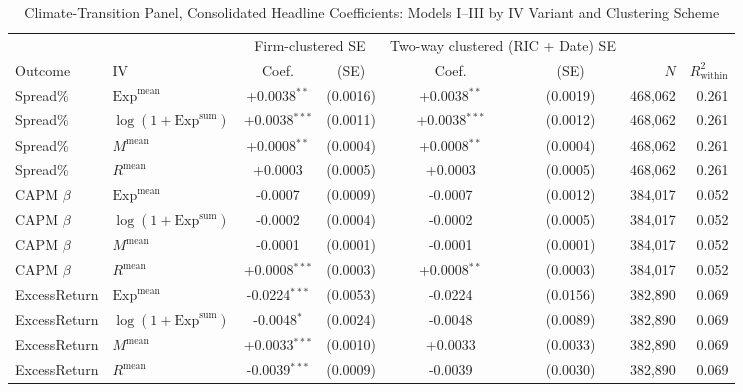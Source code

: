 \begin{table}[htbp]
\centering
\footnotesize
\caption{Climate-Transition Panel, Consolidated Headline Coefficients: Models I--III by IV Variant and Clustering Scheme}
\label{tab:v2_core}
\begin{threeparttable}
\begin{tabular}{l l c c c c r r}
\toprule
 & & \multicolumn{2}{c}{Firm-clustered SE} & \multicolumn{2}{c}{Two-way clustered (RIC + Date) SE} & & \\
\cmidrule(lr){3-4}\cmidrule(lr){5-6}
Outcome & IV & Coef. & (SE) & Coef. & (SE) & $N$ & $R^2_{\text{within}}$ \\
\midrule
Spread\% & $\mathrm{Exp}^{\text{mean}}$ & +0.0038$^{**}$ & (0.0016) & +0.0038$^{**}$ & (0.0019) & 468,062 & 0.261 \\
Spread\% & $\log(1+\mathrm{Exp}^{\text{sum}})$ & +0.0038$^{***}$ & (0.0011) & +0.0038$^{***}$ & (0.0012) & 468,062 & 0.261 \\
Spread\% & $M^{\text{mean}}$ & +0.0008$^{**}$ & (0.0004) & +0.0008$^{**}$ & (0.0004) & 468,062 & 0.261 \\
Spread\% & $R^{\text{mean}}$ & +0.0003 & (0.0005) & +0.0003 & (0.0005) & 468,062 & 0.261 \\
\addlinespace
CAPM $\beta$ & $\mathrm{Exp}^{\text{mean}}$ & -0.0007 & (0.0009) & -0.0007 & (0.0012) & 384,017 & 0.052 \\
CAPM $\beta$ & $\log(1+\mathrm{Exp}^{\text{sum}})$ & -0.0002 & (0.0004) & -0.0002 & (0.0005) & 384,017 & 0.052 \\
CAPM $\beta$ & $M^{\text{mean}}$ & -0.0001 & (0.0001) & -0.0001 & (0.0001) & 384,017 & 0.052 \\
CAPM $\beta$ & $R^{\text{mean}}$ & +0.0008$^{***}$ & (0.0003) & +0.0008$^{**}$ & (0.0003) & 384,017 & 0.052 \\
\addlinespace
ExcessReturn & $\mathrm{Exp}^{\text{mean}}$ & -0.0224$^{***}$ & (0.0053) & -0.0224 & (0.0156) & 382,890 & 0.069 \\
ExcessReturn & $\log(1+\mathrm{Exp}^{\text{sum}})$ & -0.0048$^{*}$ & (0.0024) & -0.0048 & (0.0089) & 382,890 & 0.069 \\
ExcessReturn & $M^{\text{mean}}$ & +0.0033$^{***}$ & (0.0010) & +0.0033 & (0.0033) & 382,890 & 0.069 \\
ExcessReturn & $R^{\text{mean}}$ & -0.0039$^{***}$ & (0.0009) & -0.0039 & (0.0030) & 382,890 & 0.069 \\
\bottomrule
\end{tabular}
\begin{tablenotes}\small

\end{tablenotes}
\end{threeparttable}
\end{table}
